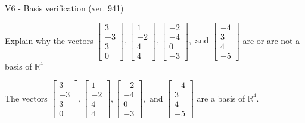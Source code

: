 \begin{exercise}
  \begin{exerciseTitle}V6 - Basis verification (ver. 941)\end{exerciseTitle}
  \begin{exerciseStatement}
    Explain why the vectors \(\left[\begin{array}{r}
3 \\
-3 \\
3 \\
0
\end{array}\right] , \left[\begin{array}{r}
1 \\
-2 \\
4 \\
4
\end{array}\right] , \left[\begin{array}{r}
-2 \\
-4 \\
0 \\
-3
\end{array}\right] , \text{ and } \left[\begin{array}{r}
-4 \\
3 \\
4 \\
-5
\end{array}\right]\) are or are not a basis of \(\mathbb{R}^4\)	


  \end{exerciseStatement}
  \begin{exerciseAnswer}
   The vectors \(\left[\begin{array}{r}
3 \\
-3 \\
3 \\
0
\end{array}\right] , \left[\begin{array}{r}
1 \\
-2 \\
4 \\
4
\end{array}\right] , \left[\begin{array}{r}
-2 \\
-4 \\
0 \\
-3
\end{array}\right] , \text{ and } \left[\begin{array}{r}
-4 \\
3 \\
4 \\
-5
\end{array}\right]\) 
  	 are  a basis of \(\mathbb{R}^4\).
  


  \end{exerciseAnswer}
\end{exercise}